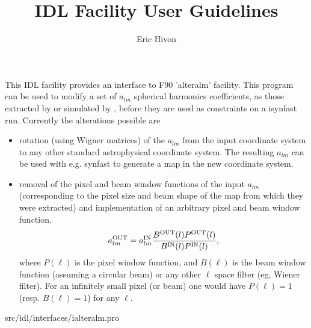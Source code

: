 
\sloppy

\title{\healpix IDL Facility User Guidelines}
 \section[ialteralm]{ }
\label{idl:ialteralm}
\author{Eric Hivon}

\begin{facility}
{This IDL facility provides an interface to F90 'alteralm' facility. 
This program can be used to modify a set of $a_{lm}$ spherical harmonics
  coefficients, as those extracted by  or 
  simulated by , before
  they are used as constraints on a isynfast run. Currently the alterations
  possible are %
\begin{itemize}
    \item rotation (using Wigner matrices) of the $a_{lm}$ from the input
    coordinate system to any other standard astrophysical coordinate system. The
    resulting $a_{lm}$ can be used with e.g. synfast to generate a map in the
    new coordinate system.
    \item removal of the pixel and beam window functions of the input
  $a_{lm}$ (corresponding to the pixel size and beam shape of the map from which
  they were extracted) and implementation of an arbitrary pixel and beam window
  function. 
\begin{equation} a_{\ell m}^{\rm OUT} = a_{\ell m}^{\rm IN} \frac{B^{\rm OUT}(\ell) P^{\rm 
 OUT}(\ell)}{B^{\rm IN}(\ell) P^{\rm IN}(\ell)}, \label{eq:alteralm} \end{equation}
where $P(\ell)$ is the pixel window function, and $B(\ell)$ is the beam window
 function (assuming a circular beam) or any other $\ell$ space filter (eg,
 Wiener filter). For an infinitely small pixel (or beam) one would have $P(\ell) =
 1$ (resp. $B(\ell) = 1$) for any $\ell$.
\end{itemize}
}
{src/idl/interfaces/ialteralm.pro}
\end{facility}

